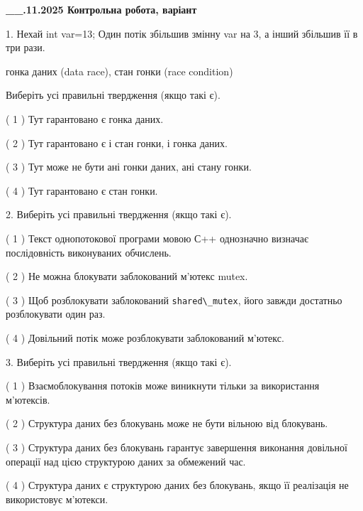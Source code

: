 \documentclass[12pt, ukrainian]{article}
\def\code#1{\Verb!#1!}
\begin{document}
\newpage
\begin {large}

\textbf{\_\_.11.2025 Контрольна робота, варіант  }\par


{
1. Нехай int var=13; Один потік збільшив змінну var на 3, а інший збільшив її в три рази.

гонка даних (data race), стан гонки (race condition)

Виберіть усі правильні твердження (якщо такі є).\par
\vspace{2mm}
( 1 ) Тут гарантовано є гонка даних.%

( 2 ) Тут гарантовано є і стан гонки, і гонка даних.%

( 3 ) Тут може не бути ані гонки даних, ані стану гонки.%

( 4 ) Тут гарантовано є стан гонки.%


2. Виберіть усі правильні твердження (якщо такі є).\par
\vspace{2mm}

( 1 ) Текст однопотокової програми мовою С++ однозначно визначає послідовність виконуваних обчислень.%

( 2 ) Не можна блокувати заблокований м’ютекс mutex.%

( 3 ) Щоб розблокувати заблокований \code{shared\_mutex}, його завжди достатньо розблокувати один раз.%

( 4 ) Довільний потік може розблокувати заблокований м’ютекс.%


3. Виберіть усі правильні твердження (якщо такі є).\par
\vspace{2mm}

( 1 ) Взаємоблокування потоків може виникнути тільки за використання м’ютексів.%

( 2 ) Структура даних без блокувань може не бути вільною від блокувань.%

( 3 ) Структура даних без блокувань гарантує завершення виконання довільної операції над цією структурою даних за обмежений час.%

( 4 ) Структура даних є структурою даних без блокувань, якщо її реалізація не використовує м’ютекси.%


}
\end{large}
\end{document}
